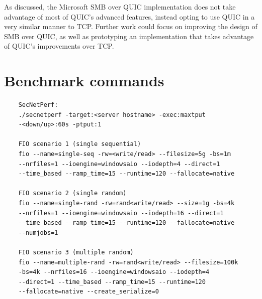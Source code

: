 \documentclass[english, 12pt, a4paper, elec, utf8, a-2b, online]{aaltothesis}
\begin{document}
As discussed, the Microsoft SMB over QUIC implementation does not take advantage of
most of QUIC's advanced features, instead opting to use QUIC in a very similar
manner to TCP. Further work could focus on improving the design of SMB over QUIC,
as well as prototyping an implementation that takes advantage of QUIC's improvements over
TCP.  
\clearpage
\printbibliography[heading=bibintoc] %

\clearpage
\thesisappendix

\section{Benchmark commands}
\label{app:bench}
\begin{verbatim}
	SecNetPerf:
	./secnetperf -target:<server hostname> -exec:maxtput
	-<down/up>:60s -ptput:1

	FIO scenario 1 (single sequential)
	fio --name=single-seq -rw=<write/read> --filesize=5g -bs=1m
	--nrfiles=1 --ioengine=windowsaio --iodepth=4 --direct=1
	--time_based --ramp_time=15 --runtime=120 --fallocate=native

	FIO scenario 2 (single random)
	fio --name=single-rand -rw=rand<write/read> --size=1g -bs=4k
	--nrfiles=1 --ioengine=windowsaio --iodepth=16 --direct=1
	--time_based --ramp_time=15 --runtime=120 --fallocate=native
	--numjobs=1

	FIO scenario 3 (multiple random)
	fio --name=multiple-rand -rw=rand<write/read> --filesize=100k
	-bs=4k --nrfiles=16 --ioengine=windowsaio --iodepth=4
	--direct=1 --time_based --ramp_time=15 --runtime=120
	--fallocate=native --create_serialize=0

\end{verbatim}
\end{document}
